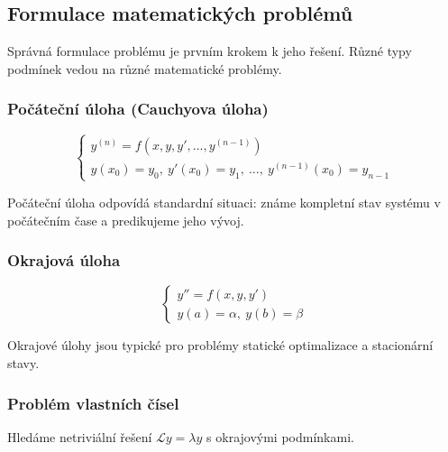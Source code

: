 \spc

\subsection{Formulace matematických problémů}

\begin{motivation}
Správná formulace problému je prvním krokem k jeho řešení. Různé typy podmínek vedou na různé matematické problémy.
\end{motivation}

\subsubsection{Počáteční úloha (Cauchyova úloha)}

\[
\begin{cases}
y^{(n)} = f\left(x, y, y', \dots, y^{(n-1)}\right) \\
y(x_0) = y_0, \ y'(x_0) = y_1, \ \dots, \ y^{(n-1)}(x_0) = y_{n-1}
\end{cases}
\]

\begin{intuition}
Počáteční úloha odpovídá standardní situaci: známe kompletní stav systému v počátečním čase a predikujeme jeho vývoj.
\end{intuition}

\subsubsection{Okrajová úloha}

\[
\begin{cases}
y'' = f(x, y, y') \\
y(a) = \alpha, \ y(b) = \beta
\end{cases}
\]

\begin{intuition}
Okrajové úlohy jsou typické pro problémy statické optimalizace a stacionární stavy.
\end{intuition}

\subsubsection{Problém vlastních čísel}

\begin{definition}
Hledáme netriviální řešení $\mathcal{L}y = \lambda y$ s okrajovými podmínkami.
\end{definition}


